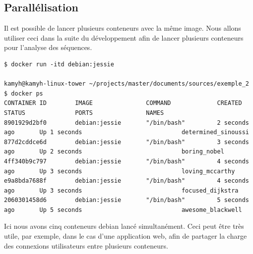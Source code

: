 \subsection{Parallélisation}

Il est possible de lancer plusieurs conteneurs avec la même image. Nous allons utiliser ceci dans la suite du développement afin de lancer plusieurs conteneurs pour l'analyse des séquences.

\begin{lstlisting}[frame=single]
$ docker run -itd debian:jessie

kamyh@kamyh-linux-tower ~/projects/master/documents/sources/exemple_2 $ docker ps
CONTAINER ID        IMAGE               COMMAND             CREATED             STATUS              PORTS               NAMES
8901929d2bf0        debian:jessie       "/bin/bash"         2 seconds ago       Up 1 seconds                            determined_sinoussi
877d2cddce6d        debian:jessie       "/bin/bash"         3 seconds ago       Up 2 seconds                            boring_nobel
4ff340b9c797        debian:jessie       "/bin/bash"         4 seconds ago       Up 3 seconds                            loving_mccarthy
e9a8bda7688f        debian:jessie       "/bin/bash"         4 seconds ago       Up 3 seconds                            focused_dijkstra
2060301458d6        debian:jessie       "/bin/bash"         5 seconds ago       Up 5 seconds                            awesome_blackwell
\end{lstlisting}

Ici nous avons cinq conteneurs debian lancé simultanément. Ceci peut être très utile, par exemple, dans le cas d'une application web, afin de partager la charge des connexions utilisateurs entre plusieurs conteneurs.
































